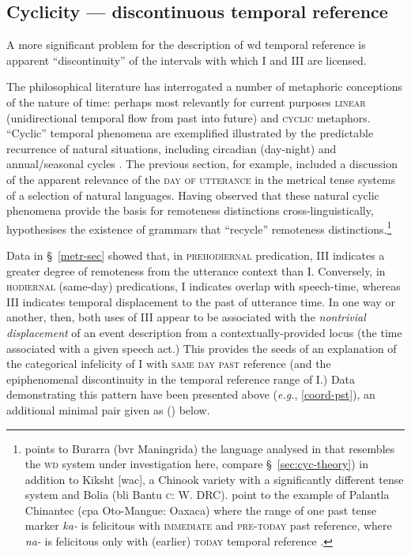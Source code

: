 \subsection{Cyclicity --- discontinuous temporal reference}


A more significant problem for the description of \gls{wd} temporal reference is apparent ``discontinuity'' of the intervals with which \gls{I} and \gls{III} are licensed.

The philosophical literature has interrogated a number of metaphoric conceptions of the nature of time: perhaps most relevantly for current purposes \textsc{linear} (unidirectional temporal flow from past into future) and \textsc{cyclic} metaphors. ``Cyclic'' temporal phenomena are exemplified illustrated by the predictable recurrence of natural situations, including circadian (day-night) and annual/seasonal cycles \citetext{\textit{e.g.}, discussion in \citealp{Whitrow1980} and \citealp{Fraser1987}}. The previous section, for example, included a discussion of the apparent relevance of the \textsc{day of utterance} in the metrical tense systems of a selection of natural languages. Having observed that these natural cyclic phenomena provide the basis for remoteness distinctions cross-linguistically, \citet[88]{Comrie1985} hypothesises the existence of grammars that ``recycle'' remoteness distinctions.\footnote{\label{xlingcyc}\citet{Comrie1985} points to Burarra (\gls{bvr} Maningrida) the language analysed in \citet{Glasgow1964} that resembles the \textsc{wd} system under investigation here, compare \S~\ref{sec:cyc-theory}) in addition to Kiksht [\gls{wac}], a Chinook variety with a significantly different tense system \citetext{see \citet[§~7]{Botne2012} for an overview of apparent reflexes of cyclic tense in the Kiksht system and similar systems in Mituku (\gls{zmq} Bantu \textsc{d}: E. DRC)} and Bolia (\gls{bli} Bantu \textsc{c}: W. DRC). \citet[104]{Bybee1994} point to the example of Palantla Chinantec (\gls{cpa} Oto-Mangue: Oaxaca) where the range of one past tense marker \textit{ka-} is felicitous with \textsc{immediate} and \textsc{pre-today} past reference, where \textit{na-} is felicitous only with (earlier) \textsc{today} temporal reference \citep[according to][25]{Merrifield1968}.}

Data in \S~\ref{metr-sec} showed that, in \textsc{prehodiernal} predication, \gls{III} indicates a greater degree of remoteness from the utterance context than \gls{I}. Conversely, in \textsc{hodiernal} (same-day) predications, \gls{I} indicates overlap with speech-time, whereas \gls{III} indicates temporal displacement to the past of utterance time. In one way or another, then, both uses of \gls{III} appear to be associated with the \textit{nontrivial displacement} of an event description from a contextually-provided locus (the time associated with a given speech act.) 
This provides the seeds of an explanation of the categorical infelicity of \gls{I} with \textsc{same day past} reference (and the epiphenomenal discontinuity in the temporal reference range of \gls{I}.) Data demonstrating this pattern have been presented above (\textit{e.g.}, \ref{coord-pst}), an additional minimal pair given as () below.

